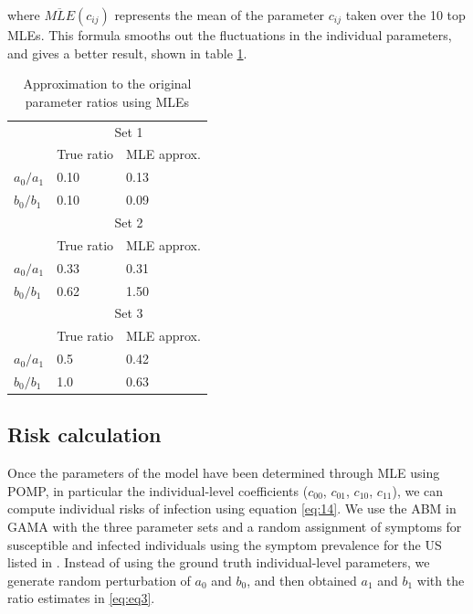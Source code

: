 \documentclass{article}
\begin{document}
where $\overline{MLE}(c_{ij})$ represents the mean of the parameter $c_{ij}$ taken over the 10 top MLEs. This formula smooths out the fluctuations in the individual parameters, and gives a better result, shown in table \ref{tab:table2}.

\begin{table}
\caption{Approximation to the original parameter ratios using MLEs}
\centering
\begin{tabular}{lll}
\rowcolor[rgb]{0.796,0.796,0.796}         & \multicolumn{2}{c}{Set 1}  \\
\rowcolor[rgb]{0.878,0.878,0.878}         & True ratio & MLE approx.   \\
{\cellcolor[rgb]{0.878,0.878,0.878}}$a_0/a_1$ & 0.10       & 0.13          \\
{\cellcolor[rgb]{0.878,0.878,0.878}}$b_0/b_1$ & 0.10       & 0.09          \\
\rowcolor[rgb]{0.796,0.796,0.796}         & \multicolumn{2}{c}{Set 2}  \\
\rowcolor[rgb]{0.878,0.878,0.878}         & True ratio & MLE approx.   \\
{\cellcolor[rgb]{0.878,0.878,0.878}}$a_0/a_1$ & 0.33       & 0.31          \\
{\cellcolor[rgb]{0.878,0.878,0.878}}$b_0/b_1$ & 0.62       & 1.50          \\
\rowcolor[rgb]{0.796,0.796,0.796}         & \multicolumn{2}{c}{Set 3}  \\
\rowcolor[rgb]{0.878,0.878,0.878}         & True ratio & MLE approx.   \\
{\cellcolor[rgb]{0.878,0.878,0.878}}$a_0/a_1$ & 0.5        & 0.42          \\
{\cellcolor[rgb]{0.878,0.878,0.878}}$b_0/b_1$ & 1.0        & 0.63         
\end{tabular}
\label{tab:table2}
\end{table}

\subsection{Risk calculation}

Once the parameters of the model have been determined through MLE using POMP, in particular the individual-level coefficients ($c_{00}$, $c_{01}$, $c_{10}$, $c_{11}$), we can compute individual risks of infection using equation \eqref{eq:14}. We use the ABM in GAMA with the three parameter sets and a random assignment of symptoms for susceptible and infected individuals using the symptom prevalence for the US listed in \cite{Menni2020}. Instead of using the ground truth individual-level parameters, we generate random perturbation of $a_0$ and $b_0$, and then obtained $a_1$ and $b_1$ with the ratio estimates in \eqref{eq:eq3}.
\end{document}
